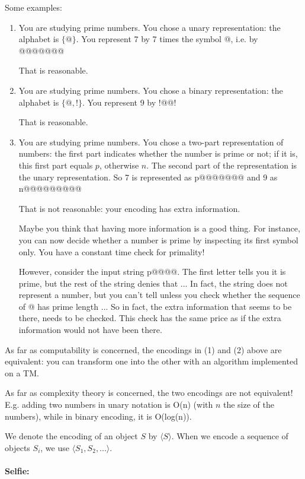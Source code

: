 Some examples:
\begin{enumerate}
\item 
You are studying prime numbers. You chose a unary representation: the
alphabet is $\{@\}$. You represent 7 by 7 times the symbol @, i.e. by
@@@@@@@

That is reasonable.

\item 
You are studying prime numbers. You chose a binary representation: the
alphabet is $\{@,!\}$. You represent 9 by !@@!

That is reasonable.


\item 
You are studying prime numbers. You chose a two-part representation of
numbers: the first part indicates whether the number is prime or not;
if it is, this first part equals $p$, otherwise $n$. The second part
of the representation is the unary representation. So 7 is
represented as p@@@@@@@ and 9 as n@@@@@@@@@

That is not reasonable: your encoding has extra information.

Maybe you think that having more information is a good thing. For instance,
you can now decide whether a number is prime by inspecting its first
symbol only. You have a constant time check for primality!

However, consider the input string p@@@@. The first letter tells you
it is prime, but the rest of the string denies that ... In fact, the
string does not represent a number, but you can't tell unless you
check whether the sequence of @ has prime length ... So in fact, the
extra information that seems to be there, needs to be checked. This
check has the same price as if the extra information would not have
been there.

\end{enumerate}


As far as computability is concerned, the encodings in (1) and (2)
above are equivalent: you can transform one into the other with an
algorithm implemented on a TM.

As far as complexity theory is concerned, the two encodings are not
equivalent! E.g. adding two numbers in unary notation is O(n) (with $n$
the size of the numbers), while in binary encoding, it is
O(log(n)).

We denote the encoding of an object $S$ by $\langle S \rangle$. When
we encode a sequence of objects $S_i$, we use $\langle
S_1,S_2,... \rangle$.

\paragraph{Selfie:}


